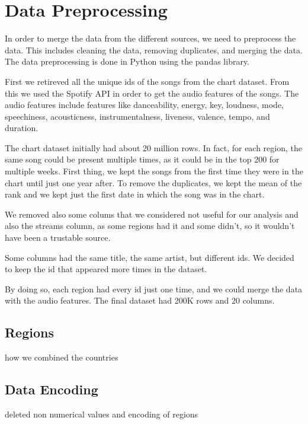 \chapter{Data Preprocessing}
In order to merge the data from the different sources, we need to preprocess the data. This includes cleaning the data, removing duplicates, and merging the data. The data preprocessing is done in Python using the pandas library. 

First we retireved all the unique ids of the songs from the chart dataset. From this we used the Spotify API in order to get the audio features of the songs. The audio features include features like danceability, energy, key, loudness, mode, speechiness, acousticness, instrumentalness, liveness, valence, tempo, and duration.

The chart dataset initially had about 20 million rows. In fact, for each region, the same song could be present multiple times, as it could be in the top 200 for multiple weeks. First thing, we kept the songs from the first time they were in the chart until just one year after. To remove the duplicates, we kept the mean of the rank and we kept just the first date in which the song was in the chart.

We removed also some colums that we considered not useful for our analysis and also the streams column, as some regions had it and some didn't, so it wouldn't have been a trustable source.

Some columns had the same title, the same artist, but different ids. We decided to keep the id that appeared more times in the dataset.

By doing so, each region had every id just one time, and we could merge the data with the audio features.
The final dataset had 200K rows and 20 columns.

\section{Regions}
how we combined the countries

\section{Data Encoding}
deleted non numerical values and encoding of regions